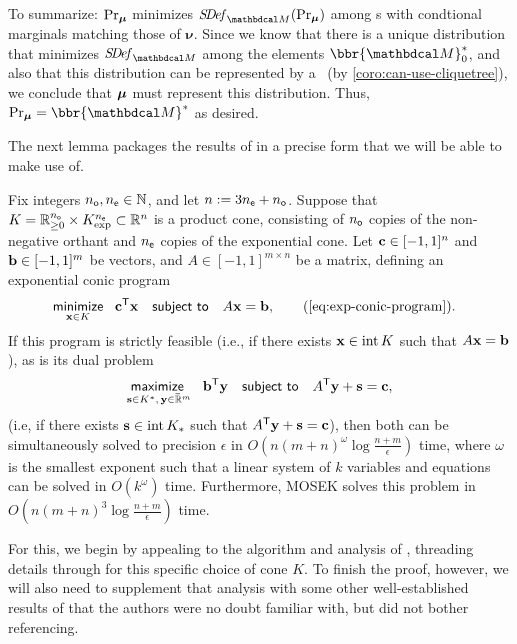 \begin{subappendices}
\begin{lproof}
    To summarize: $\Pr_{\boldsymbol\mu}$ minimizes $\SDef_{\dg M}(\Pr\nolimits_{\bmu})$ among \cactree s with condtional marginals matching those of $\boldsymbol\nu$.
    Since we know that there is a unique distribution that minimizes $\SDef_{\dg M}$ among the elements $\bbr{\dg M}_0^*$, and also that this distribution can be represented by a \actree\ (by \cref{coro:can-use-cliquetree}), we conclude that $\boldsymbol\mu$ must represent this distribution. Thus, $\Pr_{\bmu} = \bbr{\dg M}^*$ as desired.
\end{lproof}

The next lemma packages the results of \textcite{dahl2022primal,nesterov1996infeasible} in a precise form that we will be able to make use of.

\begin{lemma} \label{lem:mainlemma}
    Fix integers $n_{\sf o}, n_{\sf e} \in \mathbb N$, and let $n:= 3n_{\sf e} + n_{\sf o}$.
     Suppose that
     $K = \mathbb R_{\ge 0}^{n_{\sf o}} \times K^{n_{\sf e}}_{\exp} \subset \mathbb R^n$ is a product cone, consisting of $n_{\sf o}$ copies of the non-negative orthant and $n_{\sf e}$ copies of the exponential cone.
    Let
    $\mathbf c \in [-1,1]^{n}$ and $ \mathbf b \in [-1,1]^m$
    be vectors, and $A \in [-1,1]^{m \times n}$
    be a matrix, defining
    an exponential conic program
    \begin{align*}
        &
        \minimize_{
            \mat x \in K}~~ \mat c^{\sf T} \mat x
        \quad\subjto\quad A \mat x = \mat b,
        \tag{\ref{eq:exp-conic-program}}
        .
    \end{align*}
    If this program
    is strictly feasible (i.e., if there exists $\mathbf x \in \mathrm{int}\, K$  such that $A \mathbf x = \mathbf b$),
    as is its dual problem
    \[
        \maximize
            \limits_{
            \mat s \in K^*,\, \mat y \in \Rext^m} ~~ \mat b^{\sf T} \mat y
        \quad\subjto\quad  A^{\sf T} \mat y  +  \mat s = \mat c,
    \]
    (i.e, if there exists $\mathbf s \in \mathrm{int}\,K_*$ such that $A^{\sf T} \mathbf y + \mathbf s = \mathbf c$),
    then both
    can be simultaneously
    solved to precision $\epsilon$
    in $O(n (m+n)^{\omega} \log\frac{n+m}{\epsilon}
    )$ time,
    where $\omega$ is the smallest exponent such that a linear system of $k$ variables and equations can be solved in $O(k^\omega)$ time.
    Furthermore, MOSEK solves this problem in $O(n (m+n)^3 \log \frac{n+m}{\epsilon})$ time.
\end{lemma}
\begin{lproof}
    For this, we begin by appealing to the algorithm and analysis of
    \textcite{badenbroek2021algorithm}, threading details through for this specific choice of cone $K$.
    To finish the proof, however, we will also need to supplement that analysis with some other well-established results of \textcite{nesterov1996infeasible} that the authors were no doubt familiar with, but did not bother referencing.


\end{lproof}
\end{subappendices}
